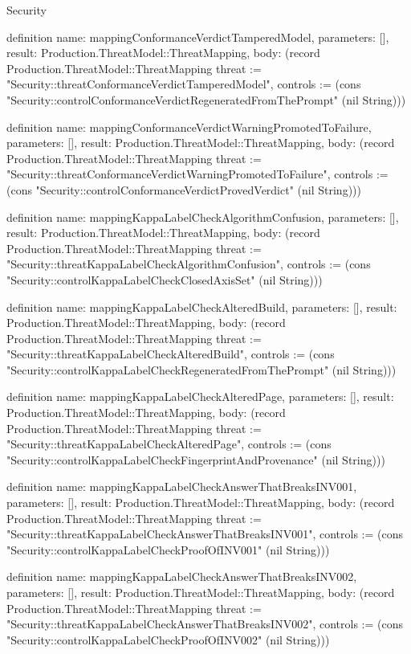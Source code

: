 \begin{lexlean}{Security}
\begin{semanticmodule}
definition{
  name: mappingConformanceVerdictTamperedModel,
  parameters: [],
  result: Production.ThreatModel::ThreatMapping,
  body: (record Production.ThreatModel::ThreatMapping {threat := "Security::threatConformanceVerdictTamperedModel", controls := (cons "Security::controlConformanceVerdictRegeneratedFromThePrompt" (nil String))})
}

definition{
  name: mappingConformanceVerdictWarningPromotedToFailure,
  parameters: [],
  result: Production.ThreatModel::ThreatMapping,
  body: (record Production.ThreatModel::ThreatMapping {threat := "Security::threatConformanceVerdictWarningPromotedToFailure", controls := (cons "Security::controlConformanceVerdictProvedVerdict" (nil String))})
}

definition{
  name: mappingKappaLabelCheckAlgorithmConfusion,
  parameters: [],
  result: Production.ThreatModel::ThreatMapping,
  body: (record Production.ThreatModel::ThreatMapping {threat := "Security::threatKappaLabelCheckAlgorithmConfusion", controls := (cons "Security::controlKappaLabelCheckClosedAxisSet" (nil String))})
}

definition{
  name: mappingKappaLabelCheckAlteredBuild,
  parameters: [],
  result: Production.ThreatModel::ThreatMapping,
  body: (record Production.ThreatModel::ThreatMapping {threat := "Security::threatKappaLabelCheckAlteredBuild", controls := (cons "Security::controlKappaLabelCheckRegeneratedFromThePrompt" (nil String))})
}

definition{
  name: mappingKappaLabelCheckAlteredPage,
  parameters: [],
  result: Production.ThreatModel::ThreatMapping,
  body: (record Production.ThreatModel::ThreatMapping {threat := "Security::threatKappaLabelCheckAlteredPage", controls := (cons "Security::controlKappaLabelCheckFingerprintAndProvenance" (nil String))})
}

definition{
  name: mappingKappaLabelCheckAnswerThatBreaksINV001,
  parameters: [],
  result: Production.ThreatModel::ThreatMapping,
  body: (record Production.ThreatModel::ThreatMapping {threat := "Security::threatKappaLabelCheckAnswerThatBreaksINV001", controls := (cons "Security::controlKappaLabelCheckProofOfINV001" (nil String))})
}

definition{
  name: mappingKappaLabelCheckAnswerThatBreaksINV002,
  parameters: [],
  result: Production.ThreatModel::ThreatMapping,
  body: (record Production.ThreatModel::ThreatMapping {threat := "Security::threatKappaLabelCheckAnswerThatBreaksINV002", controls := (cons "Security::controlKappaLabelCheckProofOfINV002" (nil String))})
}


\end{semanticmodule}
\end{lexlean}
